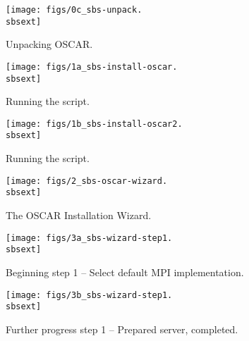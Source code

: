\begin{figure}[htbp]
  \begin{center}
    \texttt{[image: figs/0c\_sbs-unpack.\\sbsext]}
    \caption{Unpacking OSCAR.}
    \label{fig:sbs-unpacking-oscar}
  \end{center}
\end{figure}


\begin{figure}[htbp]
  \begin{center}
    \texttt{[image: figs/1a\_sbs-install-oscar.\\sbsext]}
    \caption{Running the  script.}
    \label{fig:sbs-install-oscar}
  \end{center}
\end{figure}

\begin{figure}[htbp]
  \begin{center}
    \texttt{[image: figs/1b\_sbs-install-oscar2.\\sbsext]}
    \caption{Running the  script.}
    \label{fig:sbs-install-oscar2}
  \end{center}
\end{figure}


\begin{figure}[htbp]
  \begin{center}
    \texttt{[image: figs/2\_sbs-oscar-wizard.\\sbsext]}
    \caption{The OSCAR Installation Wizard.}
    \label{fig:sbs-install-wizard}
  \end{center}
\end{figure}




\begin{figure}[htbp]
  \begin{center}
    \texttt{[image: figs/3a\_sbs-wizard-step1.\\sbsext]}
    \caption{Beginning step 1 -- Select default MPI implementation.}
    \label{fig:sbs-install-wizard-s1}
  \end{center}
\end{figure}

\begin{figure}[htbp]
  \begin{center}
    \texttt{[image: figs/3b\_sbs-wizard-step1.\\sbsext]}
    \caption{Further progress step 1 -- Prepared server, completed.}
    \label{fig:sbs-install-wizard-s1b}
  \end{center}
\end{figure}


